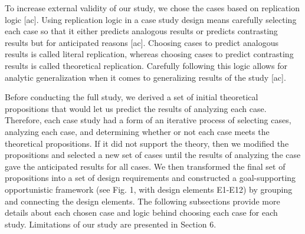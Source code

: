 \documentclass{casconpaper}
\begin{document}
{To increase external validity of our study, we chose the cases based on replication logic [ac]. Using replication logic in a case study design means carefully selecting each case so that it either predicts analogous results or predicts contrasting results but for anticipated reasons [ac]. Choosing cases to predict analogous results is called literal replication, whereas choosing cases to predict contrasting results is called theoretical replication. Carefully following this logic allows for analytic generalization when it comes to generalizing results of the study [ac].

Before conducting the full study, we derived a set of initial theoretical propositions that would let us predict the results of analyzing each case. Therefore, each case study had a form of an iterative process of selecting cases, analyzing each case, and determining whether or not each case meets the theoretical propositions. If it did not support the theory, then we modified the propositions and selected a new set of cases until the results of analyzing the case gave the anticipated results for all cases. We then transformed the final set of propositions into a set of design requirements and constructed a goal-supporting opportunistic framework (see Fig. 1, with design elements E1-E12) by grouping and connecting the design elements. The following subsections provide more details about each chosen case and logic behind choosing each case for each study. Limitations of our study are presented in Section 6.
} %
\end{document}
